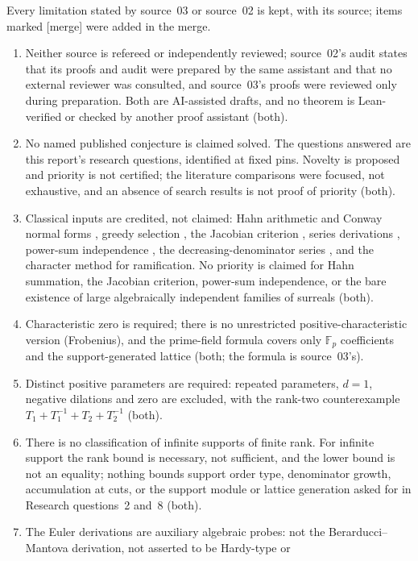 \documentclass[11pt,letterpaper]{article}
\numberwithin{equation}{section}
\theoremstyle{definition}
\theoremstyle{remark}
\newcommand{\mtag}{\textup{[merge]}}%
\begin{document}
Every limitation stated by source~03 or source~02 is kept, with its source;
items marked \mtag{} were added in the merge.
\begin{enumerate}[label=R\arabic*.,leftmargin=2.6em,itemsep=2pt]
\item Neither source is refereed or independently reviewed; source~02's audit
states that its proofs and audit were prepared by the same assistant and that
no external reviewer was consulted, and source~03's proofs were reviewed only
during preparation. Both are AI-assisted drafts, and no theorem is
Lean-verified or checked by another proof assistant (both).
\item No named published conjecture is claimed solved. The questions answered
are this report's research questions, identified at fixed pins. Novelty is
proposed and priority is not certified; the literature comparisons were
focused, not exhaustive, and an absence of search results is not proof of
priority (both).
\item Classical inputs are credited, not claimed: Hahn arithmetic and Conway
normal forms \cite{Gonshor,LM,Neumann}, greedy selection \cite{Edmonds}, the
Jacobian criterion \cite{BMS}, series derivations \cite{KM}, power-sum
independence \cite[Proposition~3]{MSW}, the decreasing-denominator series
\cite[Remark~2.18]{CDDM}, and the character method for ramification. No
priority is claimed for Hahn summation, the Jacobian criterion, power-sum
independence, or the bare existence of large algebraically independent
families of surreals (both).
\item Characteristic zero is required; there is no unrestricted
positive-characteristic version (Frobenius), and the prime-field formula
covers only $\mathbb F_p$ coefficients and the support-generated lattice
(both; the formula is source~03's).
\item Distinct positive parameters are required: repeated parameters, $d=1$,
negative dilations and zero are excluded, with the rank-two counterexample
$T_1+T_1^{-1}+T_2+T_2^{-1}$ (both).
\item There is no classification of infinite supports of finite rank. For
infinite support the rank bound is necessary, not sufficient, and the lower
bound is not an equality; nothing bounds support order type, denominator
growth, accumulation at cuts, or the support module or lattice generation asked
for in Research questions~2 and~8 (both).
\item The Euler derivations are auxiliary algebraic probes: not the
Berarducci--Mantova derivation, not asserted to be Hardy-type or

\end{enumerate}
\end{document}
